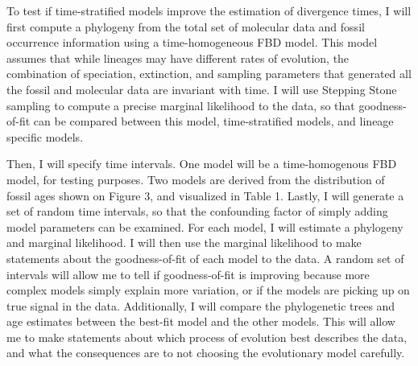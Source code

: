 \documentclass[]{article}
\begin{document}
To test if time-stratified models improve the estimation of divergence times, I will first compute a phylogeny from the total set of molecular data and fossil occurrence information using a time-homogeneous FBD model. 
This model assumes that while lineages may have different rates of evolution, the combination of speciation, extinction, and sampling parameters that generated all the fossil and molecular data are invariant with time. 
I will use Stepping Stone sampling \cite{Xie2011} to compute a precise marginal likelihood to the data, so that goodness-of-fit can be compared between this model, time-stratified models, and lineage specific models. \par
Then, I will specify time intervals. 
One model will be a time-homogenous FBD model, for testing purposes.
Two models are derived from the distribution of fossil ages shown on  Figure 3, and visualized in Table 1.
Lastly, I will generate a set of random time intervals, so that the confounding factor of simply adding model parameters can be examined. 
For each model, I will estimate a phylogeny and marginal likelihood. 
I will then use the marginal likelihood to make statements about the goodness-of-fit of each model to the data.
A random set of intervals will allow me to tell if goodness-of-fit is improving because more complex models simply explain more variation, or if the models are picking up on true signal in the data.
Additionally, I will compare the phylogenetic trees and age estimates between the best-fit model and the other models.
This will allow me to make statements about which process of evolution best describes the data, and what the consequences are to not choosing the evolutionary model carefully. \par
\end{document}
